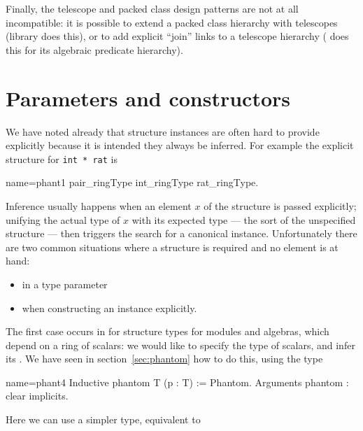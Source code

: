 Finally, the telescope and packed class design patterns are not
at all incompatible: it is possible to extend a packed class
hierarchy with telescopes (library  does this), or to add
explicit ``join'' links to a telescope hierarchy ( does this
for its algebraic predicate hierarchy).

\section{Parameters and constructors}\label{sec:phant}

\warnverytechnical{}

We have noted already that structure instances are often hard to
provide explicitly because it is intended they always be inferred.
For example the explicit  structure for \lstinline/int * rat/ is

\begin{coq}{name=phant1}{}
pair_ringType int_ringType rat_ringType.
\end{coq}

Inference usually happens when an element $x$ of the structure is
passed explicitly; unifying the actual type of $x$ with its expected
type --- the sort of the unspecified structure --- then triggers the
search for a canonical instance.
Unfortunately there are two common situations where a structure is
required and no element is at hand:
\begin{itemize}
\item in a type parameter
\item when constructing an instance explicitly.
\end{itemize}
The first case occurs in  for structure types for modules
and algebras, which depend on a ring of scalars: we would like to
specify the type of scalars, and infer its .  We have seen in
section~\ref{sec:phantom} how to do this, using the  type

\begin{coq}{name=phant4}{}
Inductive phantom T (p : T) := Phantom.
Arguments phantom : clear implicits.
\end{coq}

Here we can use a simpler type, equivalent to 

